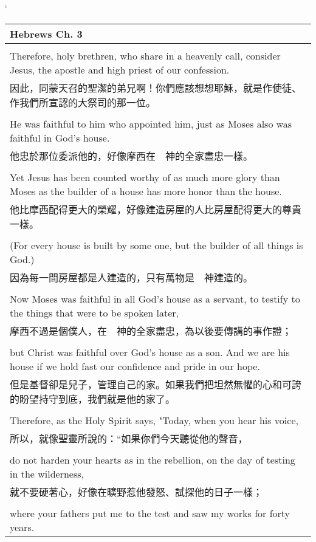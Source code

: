 \documentclass{book}
\begin{document}
\newpage
`
\begin{tabularx}{\textwidth}{p{}}
\hline
Hebrews Ch. 3 \\
\hline \\
Therefore, holy brethren, who share in a heavenly call, consider Jesus, the apostle and high priest of our confession. \\
因此，同蒙天召的聖潔的弟兄啊！你們應該想想耶穌，就是作使徒、作我們所宣認的大祭司的那一位。 \\ \\
He was faithful to him who appointed him, just as Moses also was faithful in God's house. \\
他忠於那位委派他的，好像摩西在　神的全家盡忠一樣。 \\ \\
Yet Jesus has been counted worthy of as much more glory than Moses as the builder of a house has more honor than the house. \\
他比摩西配得更大的榮耀，好像建造房屋的人比房屋配得更大的尊貴一樣。 \\ \\
(For every house is built by some one, but the builder of all things is God.) \\
因為每一間房屋都是人建造的，只有萬物是　神建造的。 \\ \\
Now Moses was faithful in all God's house as a servant, to testify to the things that were to be spoken later, \\
摩西不過是個僕人，在　神的全家盡忠，為以後要傳講的事作證； \\ \\
but Christ was faithful over God's house as a son. And we are his house if we hold fast our confidence and pride in our hope. \\
但是基督卻是兒子，管理自己的家。如果我們把坦然無懼的心和可誇的盼望持守到底，我們就是他的家了。 \\ \\
Therefore, as the Holy Spirit says, "Today, when you hear his voice, \\
所以，就像聖靈所說的：“如果你們今天聽從他的聲音， \\ \\
do not harden your hearts as in the rebellion, on the day of testing in the wilderness, \\
就不要硬著心，好像在曠野惹他發怒、試探他的日子一樣； \\ \\
where your fathers put me to the test and saw my works for forty years. \\

\end{tabularx}
\end{document}
